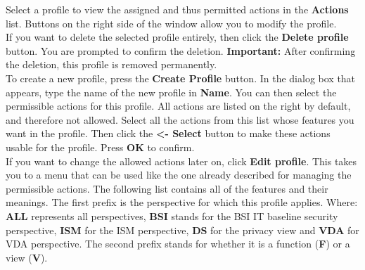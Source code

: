 \documentclass[a4paper,10pt]{book}
\begin{document}
\newline
Select a profile to view the assigned and thus permitted actions in the \textbf{Actions} list. Buttons on
the right side of the window allow you to modify the profile.
\newline\\
If you want to delete the selected profile entirely, then click the \textbf{Delete profile} button.
You are prompted to confirm the deletion. \textbf{Important:} After confirming the deletion, this profile is removed permanently.
\newline\\
To create a new profile, press the \textbf{Create Profile} button. In the dialog box that appears, type the name of the new profile in
\textbf{Name}. You can then select the permissible actions for this profile. All actions are listed on the right by default, and therefore
not allowed. Select all the actions from this list whose features you want in the profile. Then click the
\textbf{\textless- Select} button to make these actions usable for the profile. Press \textbf{OK} to confirm.
\newline\\
If you want to change the allowed actions later on, click \textbf{Edit profile}. This takes you to a menu that can
be used like the one already described for managing the permissible actions. The following list contains all of
the features and their meanings. The first prefix is the perspective for which this profile applies. Where: \textbf{ALL} represents all perspectives, \textbf{BSI} stands for the BSI IT baseline security perspective, \textbf{ISM} for the ISM perspective, \textbf{DS} for the privacy view and \textbf{VDA} for VDA perspective. The second prefix stands for whether it is a function (\textbf{F}) or a view (\textbf{V}).
\end{document}
